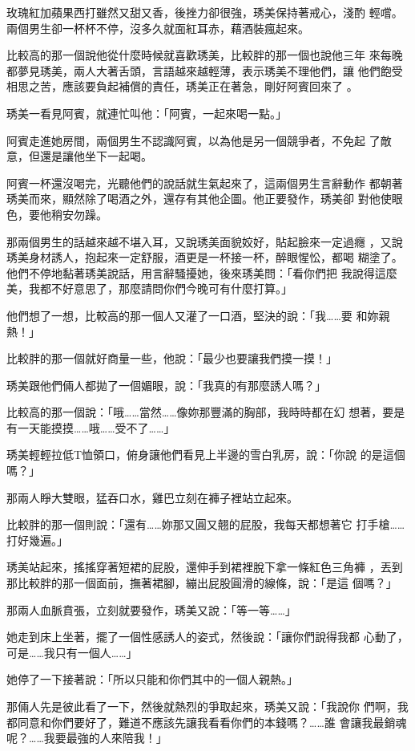 玫瑰紅加蘋果西打雖然又甜又香，後挫力卻很強，琇美保持著戒心，淺酌
輕嚐。兩個男生卻一杯杯不停，沒多久就面紅耳赤，藉酒裝瘋起來。

比較高的那一個說他從什麼時候就喜歡琇美，比較胖的那一個也說他三年
來每晚都夢見琇美，兩人大著舌頭，言語越來越輕薄，表示琇美不理他們，讓
他們飽受相思之苦，應該要負起補償的責任，琇美正在著急，剛好阿賓回來了
。

琇美一看見阿賓，就連忙叫他：「阿賓，一起來喝一點。」

阿賓走進她房間，兩個男生不認識阿賓，以為他是另一個競爭者，不免起
了敵意，但還是讓他坐下一起喝。

阿賓一杯還沒喝完，光聽他們的說話就生氣起來了，這兩個男生言辭動作
都朝著琇美而來，顯然除了喝酒之外，還存有其他企圖。他正要發作，琇美卻
對他使眼色，要他稍安勿躁。

那兩個男生的話越來越不堪入耳，又說琇美面貌姣好，貼起臉來一定過癮
，又說琇美身材誘人，抱起來一定舒服，酒更是一杯接一杯，醉眼惺忪，都喝
糊塗了。他們不停地黏著琇美說話，用言辭騷擾她，後來琇美問：「看你們把
我說得這麼美，我都不好意思了，那麼請問你們今晚可有什麼打算。」

他們想了一想，比較高的那一個人又灌了一口酒，堅決的說：「我……要
和妳親熱！」

比較胖的那一個就好商量一些，他說：「最少也要讓我們摸一摸！」

琇美跟他們倆人都拋了一個媚眼，說：「我真的有那麼誘人嗎？」

比較高的那一個說：「哦……當然……像妳那豐滿的胸部，我時時都在幻
想著，要是有一天能摸摸……哦……受不了……」

琇美輕輕拉低T恤領口，俯身讓他們看見上半邊的雪白乳房，說：「你說
的是這個嗎？」

那兩人睜大雙眼，猛吞口水，雞巴立刻在褲子裡站立起來。

比較胖的那一個則說：「還有……妳那又圓又翹的屁股，我每天都想著它
打手槍……打好幾遍。」

琇美站起來，搖搖穿著短裙的屁股，還伸手到裙裡脫下拿一條紅色三角褲
，丟到那比較胖的那一個面前，撫著裙腳，繃出屁股圓滑的線條，說：「是這
個嗎？」

那兩人血脈賁張，立刻就要發作，琇美又說：「等一等……」

她走到床上坐著，擺了一個性感誘人的姿式，然後說：「讓你們說得我都
心動了，可是……我只有一個人……」

她停了一下接著說：「所以只能和你們其中的一個人親熱。」

那倆人先是彼此看了一下，然後就熱烈的爭取起來，琇美又說：「我說你
們啊，我都同意和你們要好了，難道不應該先讓我看看你們的本錢嗎？……誰
會讓我最銷魂呢？……我要最強的人來陪我！」

